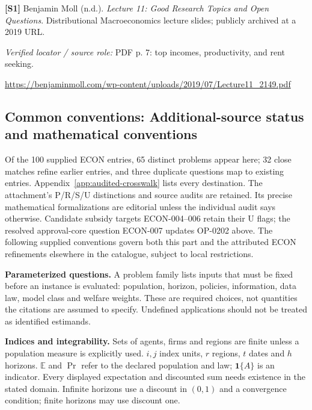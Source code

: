\documentclass[11pt,a4paper]{article}
\begin{document}
{\footnotesize\raggedright
\par\noindent\textbf{[S1]} Benjamin Moll (n.d.). \emph{Lecture 11: Good Research Topics and Open Questions}. Distributional Macroeconomics lecture slides; publicly archived at a 2019 URL.\par \textit{Verified locator / source role:} PDF p. 7: top incomes, productivity, and rent seeking.\par \url{https://benjaminmoll.com/wp-content/uploads/2019/07/Lecture11_2149.pdf}\par\smallskip
}

\subsection*{Common conventions: Additional-source status and mathematical conventions}

\label{audited:conventions}

Of the 100 supplied ECON entries, 65 distinct problems appear here; 32 close
matches refine earlier entries, and three duplicate questions map to existing
entries. Appendix~\ref{app:audited-crosswalk} lists every destination.
The attachment's P/R/S/U distinctions and source audits are retained. Its
precise mathematical formalizations are editorial unless the individual audit
says otherwise. Candidate subsidy targets ECON-004--006 retain their U flags;
the resolved approval-core question ECON-007 updates OP-0202 above.
The following supplied conventions govern both this part and the attributed
ECON refinements elsewhere in the catalogue, subject to local restrictions.

\textbf{Parameterized questions.} A problem family lists inputs that must be fixed before an instance is evaluated: population, horizon, policies, information, data law, model class and welfare weights. These are required choices, not quantities the citations are assumed to specify. Undefined applications should not be treated as identified estimands.

\textbf{Indices and integrability.} Sets of agents, firms and regions are finite unless a population measure is explicitly used. \(i,j\) index units, \(r\) regions, \(t\) dates and \(h\) horizons. \(\mathbb E\) and \(\Pr\) refer to the declared population and law; \(\mathbf1\{A\}\) is an indicator. Every displayed expectation and discounted sum needs existence in the stated domain. Infinite horizons use a discount in \((0,1)\) and a convergence condition; finite horizons may use discount one.
\end{document}

